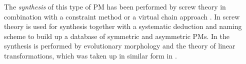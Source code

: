 \documentclass[
	graybox,
	vecphys] %
	{svmult}
\begin{document}

The \emph{synthesis} of this type of PM has been performed by screw theory in combination with a constraint method \cite{HuangLi2003} or a virtual chain approach \cite{KongGos2007}.
In \cite{DingCaoCaiKec2015} screw theory is used for synthesis together with a systematic deduction and naming scheme to build up a database of symmetric and asymmetric PMs.
In \cite{Gogu2008} the synthesis is performed by evolutionary morphology and the theory of linear transformations, which was taken up in similar form in \cite{MotevalliZohSoh2010}.
%
%
\end{document}
